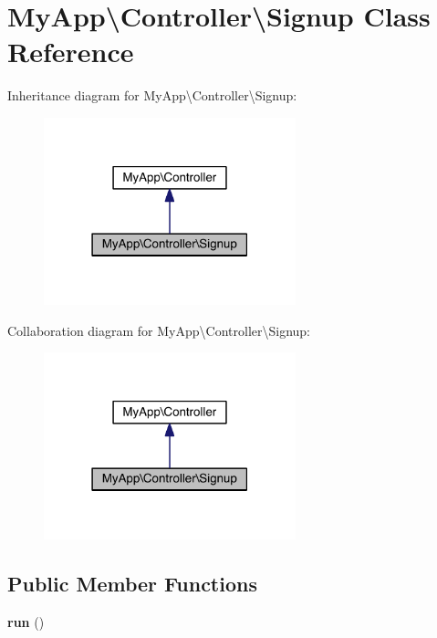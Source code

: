 \hypertarget{class_my_app_1_1_controller_1_1_signup}{}\section{My\+App\textbackslash{}Controller\textbackslash{}Signup Class Reference}
\label{class_my_app_1_1_controller_1_1_signup}


Inheritance diagram for My\+App\textbackslash{}Controller\textbackslash{}Signup\+:
\nopagebreak
\begin{figure}[H]
\begin{center}
\leavevmode
\includegraphics[width=207pt]{class_my_app_1_1_controller_1_1_signup__inherit__graph}
\end{center}
\end{figure}


Collaboration diagram for My\+App\textbackslash{}Controller\textbackslash{}Signup\+:
\nopagebreak
\begin{figure}[H]
\begin{center}
\leavevmode
\includegraphics[width=207pt]{class_my_app_1_1_controller_1_1_signup__coll__graph}
\end{center}
\end{figure}
\subsection*{Public Member Functions}
\begin{DoxyCompactItemize}
\item 
{\bfseries run} ()\hypertarget{class_my_app_1_1_controller_1_1_signup_a6b4394b3505a26084fdebe7cc5757c3c}{}\label{class_my_app_1_1_controller_1_1_signup_a6b4394b3505a26084fdebe7cc5757c3c}

\end{DoxyCompactItemize}
